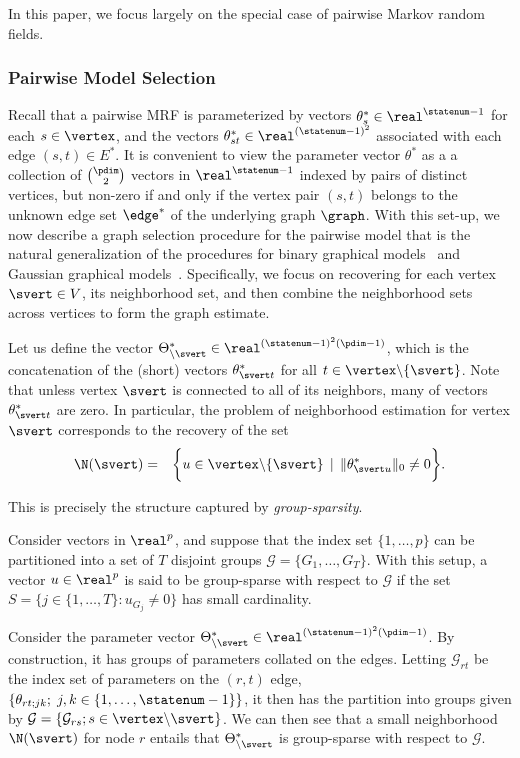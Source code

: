 In this paper, we focus largely on the special case of pairwise Markov random fields.

\subsubsection{Pairwise Model Selection}

Recall that a pairwise MRF is parameterized by vectors $\theta^*_s \in \real^{\statenum-1}$ for each $s \in \vertex$, and the vectors $\theta^*_{st} \in \real^{(\statenum-1)^2}$ associated with each edge $(s,t) \in E^*$.  It is convenient to view the parameter vector $\theta^*$ as a
a collection of $\binom{\pdim}{2}$ vectors in  $\real^{\statenum-1}$ indexed by pairs of distinct vertices,  but non-zero if and only if the vertex pair $(s,t)$ belongs to the unknown edge set $\edge^*$ of the underlying graph $\graph$. With this set-up, we now describe a graph selection procedure for the pairwise model that is the natural generalization of the procedures for binary graphical models~\citep{RWLIsing} and Gaussian graphical models~\citep{Meinshausen:06}.  Specifically, we focus on recovering for each vertex $\svert \in V$, its neighborhood set, and then combine the neighborhood sets across vertices to form the graph estimate.

\noindent Let us define the vector $\Theta^*_{\backslash \svert} \in \real^{(\statenum-1)^2(\pdim-1)}$, which is the concatenation of the (short) vectors $\theta^*_{\svert t}$ for all $t\in\vertex\backslash\{\svert\}$. Note that unless vertex $\svert$ is connected to all of its neighbors, many of vectors $\theta^*_{\svert t}$ are zero.  In particular, the
problem of neighborhood estimation for vertex $\svert$ corresponds to the recovery of the set
\begin{eqnarray*}
\N(\svert) & = & \biggr \{ u \in \vertex \backslash \{\svert\} \, \mid
\, \|\theta^*_{\svert u}\|_0 \neq 0 \biggr \}.
\end{eqnarray*}

This is precisely the structure captured by \emph{group-sparsity}. 

Consider vectors in $\real^p$, and suppose that the index set $\{1,\hdots,p\}$ can be partitioned into a set of $T$ disjoint groups $\mathcal{G} = \{G_1,\hdots,G_T\}$. With this setup, a vector $u \in \real^p$ is said to be group-sparse with respect to $\mathcal{G}$ if the set $S = \{j \in  \{1,\hdots,T\}: u_{G_j} \neq 0\}$ has small cardinality. 

Consider the parameter vector $\Theta^*_{\backslash \svert} \in \real^{(\statenum-1)^2(\pdim-1)}$. By construction, it has groups of parameters collated on the edges. Letting $\mathcal{G}_{rt}$ be the index set of parameters on the  $(r,t)$ edge, $\{\theta_{rt;jk} ;\; j,k \in \{1,\hdots,\statenum - 1\}\}$, it then has the partition into groups given by $\mathcal{G} = \{ \mathcal{G}_{rs}; s \in  \vertex \backslash \svert\}$. We can then see that a small neighborhood $\N(\svert)$ for node $r$ entails that $\Theta^*_{\backslash \svert}$ is group-sparse with respect to $\mathcal{G}$.

